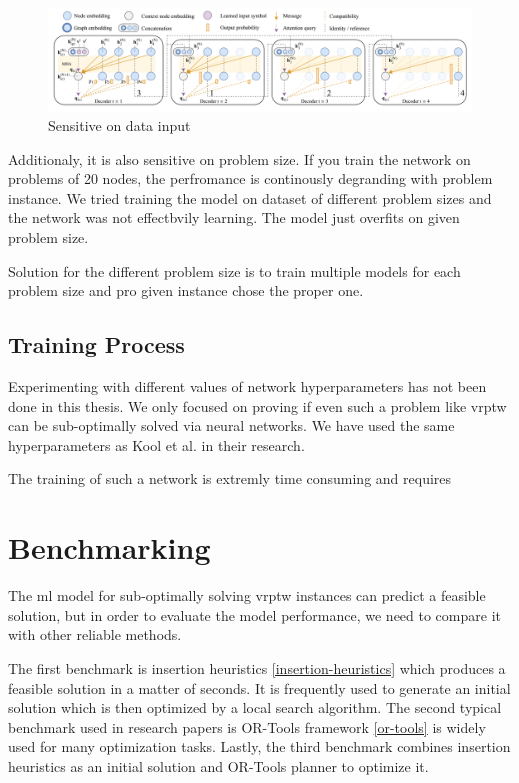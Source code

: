 \begin{figure}[ht]
    \centering
    \includegraphics[width=1.0\textwidth]{resources/vrptw-ai/decoder-diagram.png}
    \caption{Sensitive on data input}
    \label{fig:model-breaks}
\end{figure}

Additionaly, it is also sensitive on problem size. If you train the network on problems of 20 nodes, the perfromance is continously degranding with problem instance. We tried training the model on dataset of  different problem sizes and the network was not effectbvily learning. The model just overfits on given problem size. 

Solution for the different problem size is to train multiple models for each problem size and pro given instance chose the proper one. 

\subsection{Training Process}

Experimenting with different values of network hyperparameters has not been done in this thesis. We only focused on proving if even such a problem like \gls{vrptw} can be sub-optimally solved via neural networks. We have used the same hyperparameters as Kool et al. \cite{attention-route} in their research.

The training of such a network is extremly time consuming and requires 

\section{Benchmarking}
The \gls{ml} model for sub-optimally solving \gls{vrptw} instances can predict a feasible solution, but in order to evaluate the model performance, we need to compare it with other reliable methods. 

The first benchmark is insertion heuristics \ref{insertion-heuristics} which produces a feasible solution in a matter of seconds. It is frequently used to generate an initial solution which is then optimized by a local search algorithm. The second typical benchmark used in research papers is OR-Tools framework \ref{or-tools} is widely used for many optimization tasks. Lastly, the third benchmark combines insertion heuristics as an initial solution and OR-Tools planner to optimize it.

